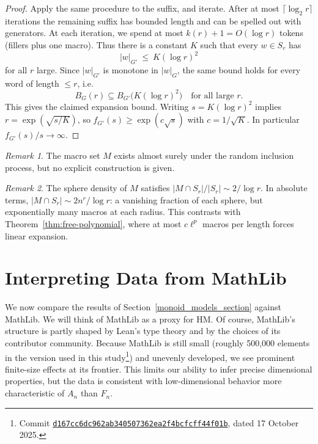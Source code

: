 \documentclass[12pt]{amsart}
\theoremstyle{definition}
\theoremstyle{remark}
\newtheorem{remark}{Remark}
\begin{document}
\begin{proof}
Apply the same procedure to the suffix, and iterate.
After at most $\lceil \log_2 r\rceil$ iterations the remaining suffix has bounded length and can be
spelled out with generators.
At each iteration, we spend at most $k(r)+1 = O(\log r)$ tokens (fillers plus one macro).
Thus there is a constant $K$ such that every $w\in S_r$ has
\[
 |w|_{G'}\ \le\ K(\log r)^2
\]
for all $r$ large.
Since $|w|_{G'}$ is monotone in $|w|_G$, the same bound holds for every word of length $\le r$,
i.e.
\[
B_G(r)\subseteq B_{G'}\!\bigl(K(\log r)^2\bigr)
\quad\text{for all large }r.
\]
This gives the claimed expansion bound.
Writing $s=K(\log r)^2$ implies $r=\exp(\sqrt{s/K})$, so
$f_{G'}(s)\ge \exp(c\sqrt{s})$ with $c=1/\sqrt{K}$.
In particular $f_{G'}(s)/s\to\infty$.
\end{proof}

\begin{remark}
The macro set $M$ exists almost surely under the random inclusion process, but no explicit construction is given.
\end{remark}

\begin{remark}
The sphere density of $M$ satisfies $|M \cap S_r|/|S_r| \sim 2/\log r$.
In absolute terms, $|M \cap S_r| \sim 2n^r/\log r$: a vanishing fraction of each sphere, but exponentially many macros at each radius.
This contrasts with Theorem~\ref{thm:free-polynomial}, where at most $c\ell^p$ macros per length forces linear expansion.
\end{remark}

\section{Interpreting Data from MathLib}
\label{mathlib_section}

We now compare the results of Section~\ref{monoid_models_section} against MathLib.
We will think of MathLib as a proxy for HM.
Of course, MathLib's structure is partly shaped by Lean's type theory and by the choices of its contributor community.
Because MathLib is still small (roughly 500,000 elements in the version used in this
study\footnote{Commit \href{https://github.com/leanprover-community/mathlib4/tree/d167cc6dc962ab340507362ea2f4bcfcff44f01b}{ \texttt{d167cc6dc962ab340507362ea2f4bcfcff44f01b}}, dated 17 October
2025.}) and unevenly developed, we see prominent finite-size effects at its frontier.
This limits our ability to infer precise dimensional properties, but the data is consistent
with low-dimensional behavior more characteristic of $A_n$ than $F_n$.
\end{document}
